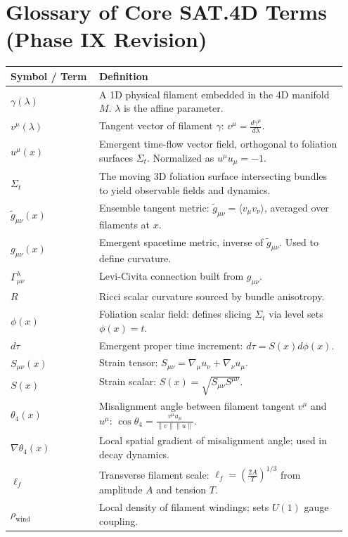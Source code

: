 
\section*{Glossary of Core SAT.4D Terms (Phase IX Revision)}

\begin{longtable}{p{0.25\linewidth} p{0.7\linewidth}}
\textbf{Symbol / Term} & \textbf{Definition} \\ \hline
$\gamma(\lambda)$ & A 1D physical filament embedded in the 4D manifold $M$. $\lambda$ is the affine parameter. \\
$v^\mu(\lambda)$ & Tangent vector of filament $\gamma$: $v^\mu = \frac{d\gamma^\mu}{d\lambda}$. \\
$u^\mu(x)$ & Emergent time-flow vector field, orthogonal to foliation surfaces $\Sigma_t$. Normalized as $u^\mu u_\mu = -1$. \\
$\Sigma_t$ & The moving 3D foliation surface intersecting bundles to yield observable fields and dynamics. \\
$\tilde{g}_{\mu\nu}(x)$ & Ensemble tangent metric: $\tilde{g}_{\mu\nu} = \langle v_\mu v_\nu \rangle$, averaged over filaments at $x$. \\
$g_{\mu\nu}(x)$ & Emergent spacetime metric, inverse of $\tilde{g}_{\mu\nu}$. Used to define curvature. \\
$\Gamma^\lambda_{\mu\nu}$ & Levi-Civita connection built from $g_{\mu\nu}$. \\
$R$ & Ricci scalar curvature sourced by bundle anisotropy. \\
$\phi(x)$ & Foliation scalar field: defines slicing $\Sigma_t$ via level sets $\phi(x)=t$. \\
$d\tau$ & Emergent proper time increment: $d\tau = S(x) d\phi(x)$. \\
$S_{\mu\nu}(x)$ & Strain tensor: $S_{\mu\nu} = \nabla_\mu u_\nu + \nabla_\nu u_\mu$. \\
$S(x)$ & Strain scalar: $S(x) = \sqrt{S_{\mu\nu}S^{\mu\nu}}$. \\
$\theta_4(x)$ & Misalignment angle between filament tangent $v^\mu$ and $u^\mu$: $\cos\theta_4 = \frac{v^\mu u_\mu}{\|v\|\|u\|}$. \\
$\nabla\theta_4(x)$ & Local spatial gradient of misalignment angle; used in decay dynamics. \\
$\ell_f$ & Transverse filament scale: $\ell_f = \left(\frac{2A}{T}\right)^{1/3}$ from amplitude $A$ and tension $T$. \\
$\rho_{\mathrm{wind}}$ & Local density of filament windings; sets $U(1)$ gauge coupling. \\

\end{longtable}
